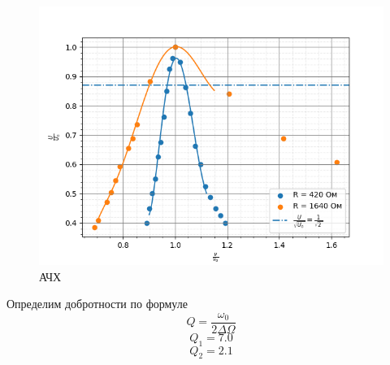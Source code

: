 \documentclass[a4paper,12 pt]{article}
\begin{document}
\begin{figure}[H]
    \centering
    \includegraphics[scale = 0.8]{ачх.png}
    \caption{АЧХ}
\end{figure}

Определим добротности по формуле
\[Q = \frac{\omega_0}{2\Delta \Omega}\]
\[Q_1 = 7.0\]
\[Q_2 = 2.1\]
\end{document}
